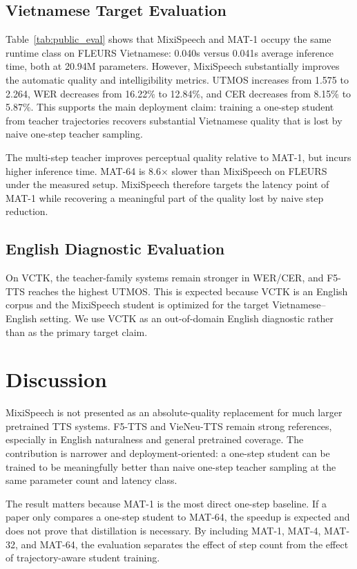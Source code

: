 \documentclass[10pt,twoside]{article}
\newcommand{\method}{MixiSpeech}
\newcommand{\mat}{MAT}
\begin{document}
\subsection{Vietnamese Target Evaluation}

Table~\ref{tab:public_eval} shows that \method{} and \mat-1 occupy the same
runtime class on FLEURS Vietnamese: 0.040s versus 0.041s average inference
time, both at 20.94M parameters. However, \method{} substantially improves the
automatic quality and intelligibility metrics. UTMOS increases from 1.575 to
2.264, WER decreases from 16.22\% to 12.84\%, and CER decreases from 8.15\% to
5.87\%. This supports the main deployment claim: training a one-step student
from teacher trajectories recovers substantial Vietnamese quality that is lost
by naive one-step teacher sampling.

The multi-step teacher improves perceptual quality relative to \mat-1, but
incurs higher inference time. \mat-64 is 8.6$\times$ slower than \method{} on
FLEURS under the measured setup. \method{} therefore targets the latency point
of \mat-1 while recovering a meaningful part of the quality lost by naive step
reduction.

\subsection{English Diagnostic Evaluation}

On VCTK, the teacher-family systems remain stronger in WER/CER, and F5-TTS
reaches the highest UTMOS. This is expected because VCTK is an English corpus
and the \method{} student is optimized for the target Vietnamese--English
setting. We use VCTK as an out-of-domain English diagnostic rather than as the
primary target claim.

\section{Discussion}

\method{} is not presented as an absolute-quality replacement for much larger
pretrained TTS systems. F5-TTS and VieNeu-TTS remain strong references,
especially in English naturalness and general pretrained coverage. The
contribution is narrower and deployment-oriented: a one-step student can be
trained to be meaningfully better than naive one-step teacher sampling at the
same parameter count and latency class.

The result matters because \mat-1 is the most direct one-step baseline. If a
paper only compares a one-step student to \mat-64, the speedup is expected and
does not prove that distillation is necessary. By including \mat-1, \mat-4,
\mat-32, and \mat-64, the evaluation separates the effect of step count from the
effect of trajectory-aware student training.
\end{document}
